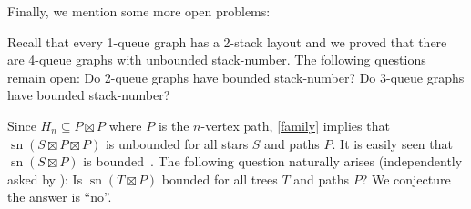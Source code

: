 \documentclass[kpfonts]{patmorin}
\DeclareMathOperator{\sn}{sn}
\begin{document}
Finally, we mention some more open problems: 

\begin{compactitem}
\item Recall that every 1-queue graph has a 2-stack layout \citep{HLR92} and we proved that there are 4-queue graphs with unbounded stack-number. The following questions remain open: Do 2-queue graphs have bounded stack-number? Do 3-queue graphs have bounded stack-number? 

\item Since $H_n\subseteq P \boxtimes P$ where $P$ is the $n$-vertex path, \cref{family} implies that $\sn(S\boxtimes P\boxtimes P)$ is unbounded for all stars $S$ and paths $P$. It is easily seen that $\sn(S\boxtimes P)$ is bounded~\citep{Pupyrev20}. The following question naturally arises (independently asked by \citet{Pupyrev20}): Is $\sn(T \boxtimes P)$ bounded for all trees $T$ and paths $P$? We conjecture the answer is ``no''.

\end{compactitem}

{
\fontsize{11.5}{12.5} 
\selectfont 

\let\oldthebibliography=\thebibliography
\let\endoldthebibliography=\endthebibliography
\renewenvironment{thebibliography}[1]{%
\begin{oldthebibliography}{#1}%
\setlength{\parskip}{0.2ex}%
\setlength{\itemsep}{0.2ex}%
}{\end{oldthebibliography}}

%


}
\end{document}
